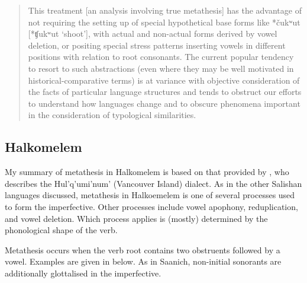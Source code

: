 \begin{quote}
This treatment [an analysis involving true metathesis]
has the advantage of not requiring the setting up of special
hypothetical base forms like *čukʷut [*ʧukʷut `shoot'],
with actual and non-actual forms derived by vowel deletion,
or positing special stress patterns inserting vowels in different positions with relation to root consonants.
The current popular tendency to resort to such abstractions
(even where they may be well motivated in historical-comparative terms)
is at variance with objective consideration
of the facts of particular language structures
and tends to obstruct our efforts to understand how languages change
and to obscure phenomena important in the consideration of typological similarities. %
\end{quote}		

\subsection{Halkomelem}\label{sec:Hal}
My summary of metathesis in Halkomelem is based on that provided by \cite{ur11},
who describes the Hul'q'umi'num' (Vancouver Island) dialect.
As in the other Salishan languages discussed,
metathesis in Halkoemelem is one of several processes used to form the imperfective.
Other processes include vowel apophony, reduplication, and vowel deletion.
Which process applies is (mostly) determined by the phonological shape of the verb.

Metathesis occurs when the verb root contains two obstruents followed by a vowel.
Examples are given in  below.
As in Saanich, non-initial sonorants
are additionally glottalised in the imperfective.

\begin{exe}
	\label{ex:HalCCV{\ra}CVC}
\end{exe}

